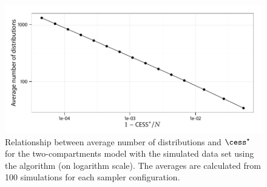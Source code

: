 \begin{figure}[t]
  \UseAltLinespread
  \includegraphics[width=\linewidth]{fig_src/CESS_Iter_Mean}
  \caption[Relations between average number of distributions and
  \protect\cess]
  {Relationship between average number of distributions and $\cess^\star$ for the two-compartments \pet model with the simulated data set using the \smc[2] algorithm (on logarithm scale). The averages are calculated from 100 simulations for each sampler configuration.}
  \label{fig:cess iter mean}
\end{figure}
